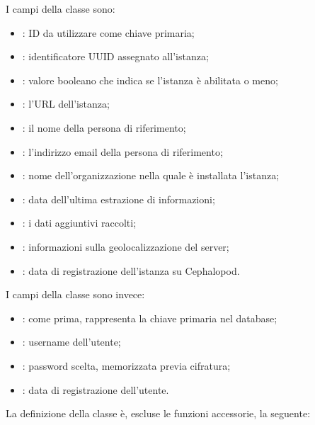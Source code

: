             I campi della classe  sono:
            
            \begin{itemize}
                \item {}: ID da utilizzare come chiave primaria;
                \item {}: identificatore \ac{UUID} assegnato all'istanza;
                \item {}: valore booleano che indica se l'istanza è abilitata o meno;
                \item {}: l'\ac{URL} dell'istanza;
                \item {}: il nome della persona di riferimento;
                \item {}: l'indirizzo email della persona di riferimento;
                \item {}: nome dell'organizzazione nella quale è installata l'istanza;
                \item {}: data dell'ultima estrazione di informazioni;
                \item {}: i dati aggiuntivi raccolti;
                \item {}: informazioni sulla geolocalizzazione del server;
                \item {}: data di registrazione dell'istanza su Cephalopod.
            \end{itemize}
            
            I campi della classe  sono invece:
            
            \begin{itemize}
                \item {}: come prima, rappresenta la chiave primaria nel database;
                \item {}: username dell'utente;
                \item {}: password scelta, memorizzata previa cifratura;
                \item {}: data di registrazione dell'utente.
            \end{itemize}
            
            La definizione della classe  è, escluse le funzioni accessorie, la seguente:
            
